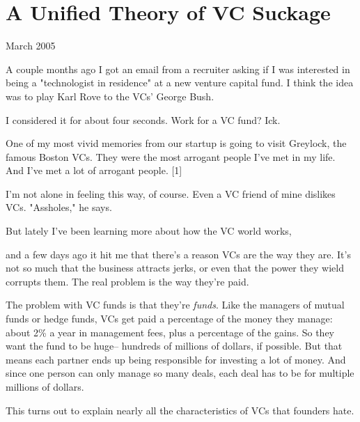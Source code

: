 \chapter{A Unified Theory of VC Suckage}


            
              
                

March 2005

A couple months ago I got an email from
                  a recruiter asking if I was interested in being a
                  "technologist in residence" at a new venture capital fund. I
                  think the idea was to play Karl Rove to the VCs' George
                  Bush.

I considered it for about four seconds. Work
                  for a VC fund? Ick.

One of my most vivid memories
                  from our startup is going to visit Greylock, the famous Boston
                  VCs. They were the most arrogant people I've met in my life.
                  And I've met a lot of arrogant people. [1]

I'm not
                  alone in feeling this way, of course. Even a VC friend of mine
                  dislikes VCs. "Assholes," he says.

But lately I've
                  been learning more about how the VC world works,
                  
                  and a few days ago it hit me that there's a reason VCs are the
                  way they are. It's not so much that the business attracts
                  jerks, or even that the power they wield corrupts them. The
                  real problem is the way they're paid.

The problem
                  with VC funds is that they're \emph{funds}. Like the managers
                  of mutual funds or hedge funds, VCs get paid a percentage of
                  the money they manage: about 2\% a year in management fees,
                  plus a percentage of the gains. So they want the fund to be
                  huge-- hundreds of millions of dollars, if possible. But that
                  means each partner ends up being responsible for investing a
                  lot of money. And since one person can only manage so many
                  deals, each deal has to be for multiple millions of
                  dollars.

This turns out to explain nearly all the
                  characteristics of VCs that founders hate.

